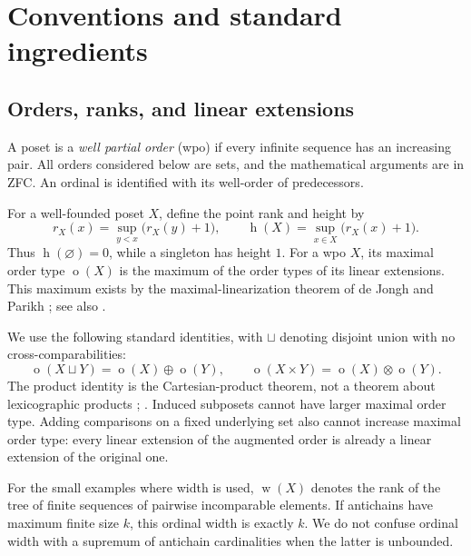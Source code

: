 \documentclass[11pt,a4paper]{article}
\theoremstyle{definition}
\theoremstyle{remark}
\newcommand{\otype}{\operatorname{o}}
\newcommand{\height}{\operatorname{h}}
\newcommand{\width}{\operatorname{w}}
\begin{document}
\section{Conventions and standard ingredients}

\subsection{Orders, ranks, and linear extensions}
A poset is a \emph{well partial order} (wpo) if every infinite sequence has
an increasing pair. All orders considered below are sets, and the
mathematical arguments are in ZFC. An ordinal is identified with its
well-order of predecessors.

For a well-founded poset $X$, define the point rank and height by
\begin{equation}\label{eq:rankdef}
 r_X(x)=\sup_{y<x}\bigl(r_X(y)+1\bigr),
 \qquad
 \height(X)=\sup_{x\in X}\bigl(r_X(x)+1\bigr).
\end{equation}
Thus $\height(\varnothing)=0$, while a singleton has height $1$.
For a wpo $X$, its maximal order type $\otype(X)$ is the maximum of the
order types of its linear extensions. This maximum exists by the
maximal-linearization theorem of de Jongh and Parikh
\cite{deJonghParikh}; see also \cite[Theorem~3.4]{DSS}.

We use the following standard identities, with $\sqcup$ denoting disjoint
union with no cross-comparabilities:
\begin{equation}\label{eq:standard}
 \otype(X\sqcup Y)=\otype(X)\oplus\otype(Y),
 \qquad
 \otype(X\times Y)=\otype(X)\otimes\otype(Y).
\end{equation}
The product identity is the Cartesian-product theorem, not a theorem about
lexicographic products \cite[Theorem~3.5]{deJonghParikh};
\cite[Lemmas~4.2 and~4.5]{DSS}. Induced subposets cannot have larger maximal
order type. Adding comparisons on a fixed underlying set also cannot
increase maximal order type: every linear extension of the augmented order
is already a linear extension of the original one.

For the small examples where width is used, $\width(X)$ denotes the rank
of the tree of finite sequences of pairwise incomparable elements. If
antichains have maximum finite size $k$, this ordinal width is exactly $k$.
We do not confuse ordinal width with a supremum of antichain cardinalities
when the latter is unbounded.
\end{document}
